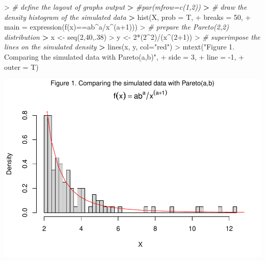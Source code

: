 \documentclass[
]{article}
\newenvironment{Shaded}{\begin{snugshade}}{\end{snugshade}}
\newcommand{\AttributeTok}[1]{\textcolor[rgb]{0.77,0.63,0.00}{#1}}
\newcommand{\CommentTok}[1]{\textcolor[rgb]{0.56,0.35,0.01}{\textit{#1}}}
\newcommand{\DecValTok}[1]{\textcolor[rgb]{0.00,0.00,0.81}{#1}}
\newcommand{\ErrorTok}[1]{\textcolor[rgb]{0.64,0.00,0.00}{\textbf{#1}}}
\newcommand{\FunctionTok}[1]{\textcolor[rgb]{0.00,0.00,0.00}{#1}}
\newcommand{\NormalTok}[1]{#1}
\newcommand{\OtherTok}[1]{\textcolor[rgb]{0.56,0.35,0.01}{#1}}
\newcommand{\SpecialCharTok}[1]{\textcolor[rgb]{0.00,0.00,0.00}{#1}}
\newcommand{\StringTok}[1]{\textcolor[rgb]{0.31,0.60,0.02}{#1}}
\begin{document}
\begin{Shaded}
\begin{Highlighting}[]
\SpecialCharTok{\textgreater{}} \CommentTok{\# define the layout of graph\textquotesingle{}s output}
\ErrorTok{\textgreater{}} \CommentTok{\#par(mfrow=c(1,2))}
\ErrorTok{\textgreater{}} \CommentTok{\# draw the density histogram of the simulated data}
\ErrorTok{\textgreater{}} \FunctionTok{hist}\NormalTok{(X, }\AttributeTok{prob =}\NormalTok{ T, }
\SpecialCharTok{+}      \AttributeTok{breaks =} \DecValTok{50}\NormalTok{, }
\SpecialCharTok{+}      \AttributeTok{main =} \FunctionTok{expression}\NormalTok{(}\FunctionTok{f}\NormalTok{(x)}\SpecialCharTok{==}\NormalTok{ab}\SpecialCharTok{\^{}}\NormalTok{a}\SpecialCharTok{/}\NormalTok{x}\SpecialCharTok{\^{}}\NormalTok{(a}\SpecialCharTok{+}\DecValTok{1}\NormalTok{))) }
\SpecialCharTok{\textgreater{}} \CommentTok{\# prepare the Pareto(2,2) distribution}
\ErrorTok{\textgreater{}}\NormalTok{ x }\OtherTok{\textless{}{-}} \FunctionTok{seq}\NormalTok{(}\DecValTok{2}\NormalTok{,}\DecValTok{40}\NormalTok{,.}\DecValTok{38}\NormalTok{)}
\SpecialCharTok{\textgreater{}}\NormalTok{ y }\OtherTok{\textless{}{-}} \DecValTok{2}\SpecialCharTok{*}\NormalTok{(}\DecValTok{2}\SpecialCharTok{\^{}}\DecValTok{2}\NormalTok{)}\SpecialCharTok{/}\NormalTok{(x}\SpecialCharTok{\^{}}\NormalTok{(}\DecValTok{2}\SpecialCharTok{+}\DecValTok{1}\NormalTok{))}
\SpecialCharTok{\textgreater{}} \CommentTok{\# superimpose the lines on the simulated density}
\ErrorTok{\textgreater{}} \FunctionTok{lines}\NormalTok{(x, y, }\AttributeTok{col=}\StringTok{"red"}\NormalTok{)}
\SpecialCharTok{\textgreater{}} \FunctionTok{mtext}\NormalTok{(}\StringTok{"Figure 1. Comparing the simulated data with Pareto(a,b)"}\NormalTok{,}
\SpecialCharTok{+}       \AttributeTok{side =} \DecValTok{3}\NormalTok{,}
\SpecialCharTok{+}       \AttributeTok{line =} \SpecialCharTok{{-}}\DecValTok{1}\NormalTok{,}
\SpecialCharTok{+}       \AttributeTok{outer =}\NormalTok{ T)}
\end{Highlighting}
\end{Shaded}

\includegraphics[width=1\linewidth,height=0.5\textheight]{HW_02_Chenguang_Pan_files/figure-latex/unnamed-chunk-2-1}
\end{document}
